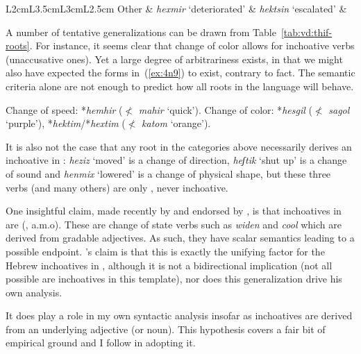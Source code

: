 \begin{exe}
\begin{xlist}
\begin{xlist}
\begin{exe}
\begin{exe}
\begin{xlist}
\begin{exe}
\begin{xlist}
\begin{exe}
\begin{xlist}
\begin{xlist}
\begin{table}
\begin{tabularx}{\textwidth}{L{2cm}L{3.5cm}L{3cm}L{2.5cm}}
	Other & \emph{hexmir} `deteriorated' & \emph{hek{ts}in} `escalated' &  \\
\lspbottomrule
 	\end{tabularx}
\caption{Lexical semantic classes for alternating verbs in {\thif} and transitive foils}
\label{tab:vd:thif-roots}
\end{table}



A number of tentative generalizations can be drawn from Table~\ref{tab:vd:thif-roots}. For instance, it seems clear that change of color allows for inchoative verbs (unaccusative ones). Yet a large degree of arbitrariness exists, in that we might also have expected the forms in~(\ref{ex:4n9}) to exist, contrary to fact. The semantic criteria alone are not enough to predict how all roots in the language will behave.
 \begin{exe}
 \ex  \label{ex:4n9}
 \begin{xlist} 
 	\ex  Change of speed: 
		*\emph{hemhir} ($\nless$ \emph{mahir} `quick').
 	\ex  Change of color: 
		*\emph{hesgil} ($\nless$ \emph{sagol} `purple'), *\emph{hektim}/*\emph{hextim} ($\nless$ \emph{katom} `orange').
 \z
\z 

It is also not the case that any root in the categories above necessarily derives an inchoative in {\thif}: \emph{heziz} `moved' is a change of direction, \emph{heʃtik} `shut up' is a change of sound and \emph{henmix} `lowered' is a change of physical shape, but these three verbs (and many others) are only , never inchoative.

One insightful claim, made recently by \cite{lev16} and endorsed by \cite{kastner19tlr}, is that inchoatives in {\thif} are \textsc{} (\citealt{dowty91,hayetal99,rotsteinwinter04,kennedylevin08,bobaljik12,mcnally17}, a.m.o). These are change of state verbs such as \emph{widen} and \emph{cool} which are derived from gradable adjectives. As such, they have scalar semantics leading to a possible endpoint. \citeauthor{lev16}'s claim is that this is exactly the unifying factor for the Hebrew inchoatives in {\thif}, although it is not a bidirectional implication (not all possible  are inchoatives in this template), nor does this generalization drive his own analysis.

It does play a role in my own syntactic analysis insofar as inchoatives are derived from an underlying adjective (or noun). This hypothesis covers a fair bit of empirical ground and I follow \cite{lev16} in adopting it. 


\end{xlist}
\end{exe}
\end{xlist}
\end{xlist}
\end{exe}
\end{xlist}
\end{exe}
\end{xlist}
\end{exe}
\end{exe}
\end{xlist}
\end{xlist}
\end{exe}
